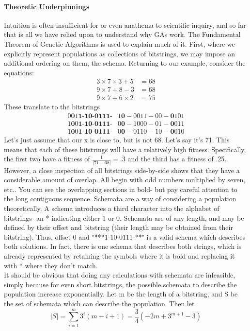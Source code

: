 \paragraph{Theoretic Underpinnings}
Intuition is often insufficient for or even anathema to scientific inquiry, and so far that is all we have relied upon to understand why GAs work.  The Fundamental Theorem of Genetic Algorithms is used to explain much of it.  First, where we explicitly represent populations as collections of bitstrings, we may impose an additional ordering on them, the schema.  Returning to our example, consider the equations: \begin{align*}
3 \times 7 \times 3 + 5 &= 68\\
9 \times 7 + 8 - 3 &= 68\\
9 \times 7 + 6 \times 2 &= 75
\end{align*}  
These translate to the bitstrings
\begin{align*}
0\textbf{0}1\textbf{1-10-0111-}&1\textbf{0}-0011-00-\textbf{0}101\\
1\textbf{0}0\textbf{1-10-0111-}&0\textbf{0}-1000-01-\textbf{0}011\\
1\textbf{0}0\textbf{1-10-0111-}&0\textbf{0}-0110-10-\textbf{0}010
\end{align*}
Let's just assume that our x is close to, but is not 68.  Let's say it's 71.  This means that each of these bitstrings will have a relatively high fitness.  Specifically, the first two have a fitness of $\frac{1}{|71-68|}=\overline{.3}$ and the third has a fitness of .25.   However, a close inspection of all bitstrings side-by-side shows that they have a considerable amount of overlap.  All begin with odd numbers multiplied by seven, etc..  You can see the overlapping sections in bold- but pay careful attention to the long contiguous sequence.
Schemata are a way of considering a population theoretically.  A schema introduces a third character into the alphabet of bitstrings- an * indicating either 1 or 0.  Schemata are of any length, and may be defined by their offset and bitstring (their length may be obtained from their bitstring).  Thus, offset 0 and "***1-10-0111-**" is a valid schema which describes both solutions.  In fact, there is one schema that describes both strings, which is already represented by retaining the symbols where it is bold and replacing it with * where they don't match.\\It should be obvious that doing any calculations with schemata are infeasible, simply because for even short bitstrings, the possible schemata to describe the population increase exponentially. Let m be the length of a bitstring, and S be the set of schemata which can describe the population.  Then let \begin{equation*}
	|S|=\sum_{i=1}^{m}3^i(m-i+1) = \frac{3}{4}(-2m+3^{m+1}-3)
	\end{equation*}
